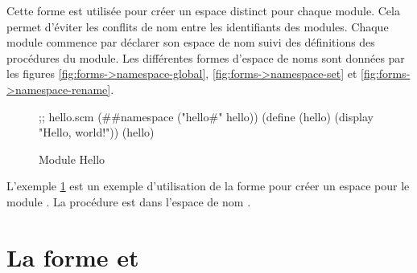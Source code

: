 





Cette forme est utilisée pour créer un espace distinct pour chaque module.
Cela permet d'éviter les conflits de nom entre les identifiants des modules.
Chaque module commence par déclarer son espace de nom suivi des définitions
des procédures du module. Les différentes formes d'espace de noms sont données
par les figures \ref{fig:forms->namespace-global}, \ref{fig:forms->namespace-set}
et \ref{fig:forms->namespace-rename}.
\\
\begin{figure}[ht]
  \centering
\begin{mplisting}{0.6}
;; hello.scm
(##namespace ("hello#" hello))
(define (hello)
  (display "Hello, world!\n"))
(hello)
\end{mplisting}
  \caption{Module Hello}
  \label{fig:namespace->hello}
\end{figure}

L'exemple \ref{fig:namespace->hello} est un exemple d'utilisation de la forme
 pour créer un espace pour le module .
La procédure  est dans l'espace de nom .

\section{La forme  et }

